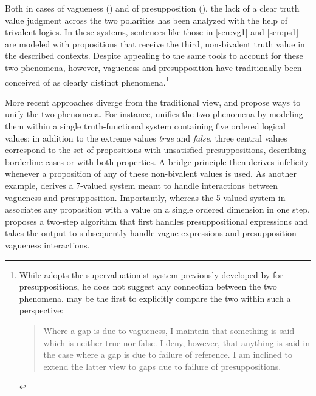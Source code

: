 \documentclass[12pt, letterpaper]{article}
\begin{document}
{Both in cases of vagueness (\citealt{mehlberg1958,fine1975:vagueness,tye1995:sorites}) and of presupposition (\citealt{vanFraassen1966:reference,fox2012,george2008}), the lack of a clear truth value judgment across the two polarities has been analyzed with the help of trivalent logics. In these systems, sentences like those in \ref{sen:vg1} and \ref{sen:ps1} are modeled with propositions that receive the third, non-bivalent truth value in the described contexts. Despite appealing to the same tools to account for these two phenomena, however, vagueness and presupposition have traditionally been conceived of as clearly distinct phenomena.\footnote{\label{TyeFN}While \cite{fine1975:vagueness} adopts the supervaluationist system previously developed by \cite{vanFraassen1966:reference} for presuppositions, he does not suggest any connection between the two phenomena. \cite{tye1995:sorites} may be the first to explicitly compare the two within such a perspective: \begin{quotation}\noindent Where a gap is due to vagueness, I maintain that something is said which is neither true nor false. I deny, however, that anything is said in the case where a gap is due to failure of reference. I am inclined to extend the latter view to gaps due to failure of presuppositions.\end{quotation}}

More recent approaches diverge from the traditional view, and propose ways to unify the two phenomena. For instance, \cite{Zehr:2014} unifies the two phenomena by modeling them within a single truth-functional system containing five ordered logical values: in addition to the extreme values \textit{true} and \textit{false}, three central values correspond to the set of propositions with unsatisfied presuppositions, describing borderline cases or with both properties. A bridge principle then derives infelicity whenever a proposition of any of these non-bivalent values is used. As another example, \cite{spector2015:7valued} derives a 7-valued system meant to handle interactions between vagueness and presupposition. Importantly, whereas the 5-valued system in \cite{Zehr:2014} associates any proposition with a value on a single ordered dimension in one step, \cite{spector2015:7valued} proposes a two-step algorithm that first handles presuppositional expressions and takes the output to subsequently handle vague expressions and presupposition-vagueness interactions.%

}
\end{document}
